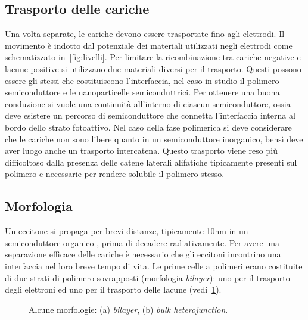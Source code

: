 \subsection{Trasporto delle cariche}
\label{sec:trasporto}
Una volta separate, le cariche devono essere trasportate fino agli elettrodi. Il movimento è indotto dal potenziale dei materiali utilizzati negli elettrodi come schematizzato in~\ref{fig:livelli}. Per limitare la ricombinazione tra cariche negative e lacune positive si utilizzano due materiali diversi per il trasporto. Questi possono essere gli stessi che costituiscono l'interfaccia, nel caso in studio il polimero semiconduttore e le nanoparticelle semiconduttrici. Per ottenere una buona conduzione si vuole una continuità all'interno di ciascun semiconduttore, ossia deve esistere un percorso di semiconduttore che connetta l'interfaccia interna al bordo dello strato fotoattivo. Nel caso della fase polimerica si deve considerare che le cariche non sono libere quanto in un semiconduttore inorganico, bensì deve aver luogo anche un trasporto intercatena. Questo trasporto viene reso più difficoltoso dalla presenza delle catene laterali alifatiche tipicamente presenti sul polimero e necessarie per rendere solubile il polimero stesso.
\subsection{Morfologia}
Un eccitone si propaga per brevi distanze, tipicamente 10nm in un semiconduttore organico \cite{fv-CdSe-OA}, prima di decadere radiativamente. Per avere una separazione efficace delle cariche è necessario che gli eccitoni incontrino una interfaccia nel loro breve tempo di vita. Le prime celle a polimeri erano costituite di due strati di polimero sovrapposti (morfologia \emph{bilayer}): uno per il trasporto degli elettroni ed uno per il trasporto delle lacune (vedi~\ref{fig:bilayer-bulk-heterojunction}).

\begin{figure}[!htb]
\caption{\footnotesize{Alcune morfologie: (a) \emph{bilayer}, (b) \emph{bulk heterojunction}. }}
\label{fig:bilayer-bulk-heterojunction}
\end{figure}
  

